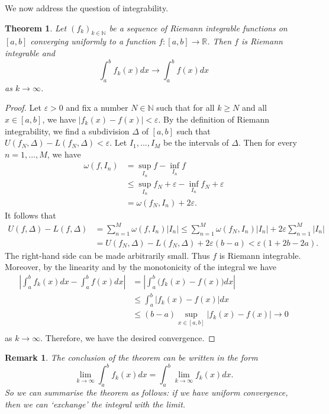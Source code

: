 \documentclass[a4paper,reqno]{amsart}
\numberwithin{equation}{section}
\newtheorem{theorem}[definition]{Theorem}
\newtheorem{remark}[definition]{Remark}
\def\R{\mathbb{R}}
\begin{document}
We now address the question of integrability.


\begin{theorem}\label{limit:integral}
Let $(f_k)_{k\in \mathbb{N}}$ be a sequence of Riemann integrable functions on $[a,b]$ converging uniformly to a function $f : [a,b] \to \R$. Then $f$ is Riemann integrable and
$$
\int_a^b f_k(x)dx \to \int_a^b f(x)dx
$$
as $k \to \infty$.
\end{theorem}


\begin{proof}
Let $\varepsilon > 0$ and fix a number $N \in \mathbb{N}$ such that for all $k \geq N$ and all $x \in [a, b]$, we have $|f_k (x) - f (x)| < \varepsilon$.
By the definition of Riemann integrability, we find a subdivision $\Delta$ of $[a,b]$ such that $U(f_N,\Delta) - L(f_N,\Delta) < \varepsilon$. Let $I_1,...,I_M$ be the intervals of
$\Delta$. Then for every $n = 1,...,M$, we have
\begin{align*}
\omega(f, I_n) &= \sup_{I_n} f - \inf_{I_n} f\\
&\leq \sup_{I_n} f_N + \varepsilon - \inf_{I_n} f_N  + \varepsilon\\
&= \omega(f_N , I_n) + 2\varepsilon.
\end{align*}
It follows that
\begin{align*}
U(f,\Delta) - L(f,\Delta) &= \sum_{n=1}^M \omega(f, I_n) |I_n| \leq \sum_{n=1}^M \omega(f_N, I_n) |I_n| + 2\varepsilon\sum_{n=1}^M |I_n| \\
& = U(f_N,\Delta) - L(f_N,\Delta) + 2\varepsilon (b-a) < \varepsilon (1+ 2b - 2a).
\end{align*}
The right-hand side can be made arbitrarily small. Thus $f$ is Riemann integrable.
Moreover, by the linearity and by the monotonicity of the integral we have
\begin{align*}
\left|\int_a^b f_k(x)dx - \int_a^b f(x)dx\right| &= \left|\int_a^b \Big(f_k(x) - f(x)\Big)dx \right|\\
&\leq \int_a^b \Big|f_k(x) - f(x)\Big|dx\\
&\leq(b-a) \sup_{x\in [a,b]} \Big|f_k(x) - f(x)\Big| \to 0\\
\end{align*}
as $k\to \infty$. Therefore, we have the desired convergence.
\end{proof}


\begin{remark}
The conclusion of the theorem can be written in the form
$$
\lim_{k\to \infty}\int_a^b f_k(x)dx = \int_a^b \lim_{k\to \infty} f_k(x)dx.
$$
So we can summarise the theorem as follows: if we have uniform convergence,
then we can `exchange' the integral with the limit.
\end{remark}
\end{document}
